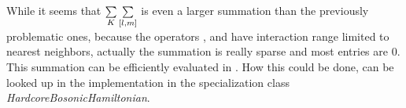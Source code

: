 While it seems that $\lsum[K] \fullneighborsum{l}{m}$ is even a larger summation than the previously problematic ones, because the operators ,  and  have interaction range limited to nearest neighbors, actually the summation is really sparse and most entries are $0$.
This summation can be efficiently evaluated in .
How this could be done, can be looked up in the implementation  in the specialization class \emph{HardcoreBosonicHamiltonian}.